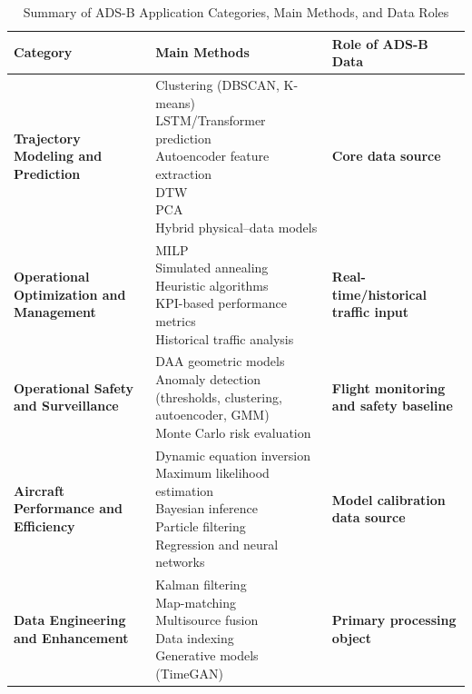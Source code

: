  
\begin{table}[htbp]
\centering
\caption{Summary of ADS-B Application Categories, Main Methods, and Data Roles}
\begin{tabular}{p{3cm} p{6cm} p{3cm}}
\hline
\textbf{Category} & \textbf{Main Methods} & \textbf{Role of ADS-B Data} \\
\hline
\textbf{Trajectory Modeling and Prediction} &
\makecell[l]{Clustering (DBSCAN, K-means)\\
LSTM/Transformer prediction\\
Autoencoder feature extraction\\
DTW\\
PCA\\
Hybrid physical–data models} &
\textbf{Core data source} \\
\hline

\textbf{Operational Optimization and Management} &
\makecell[l]{
MILP\\
Simulated annealing\\
Heuristic algorithms\\
KPI-based performance metrics\\
Historical traffic analysis
} &
\textbf{Real-time/historical traffic input} \\
\hline

\textbf{Operational Safety and Surveillance} &
\makecell[l]{
DAA geometric models\\
Anomaly detection (thresholds, clustering, autoencoder, GMM)\\
Monte Carlo risk evaluation
} &
\textbf{Flight monitoring and safety baseline} \\
\hline

\textbf{Aircraft Performance and Efficiency} &
\makecell[l]{
Dynamic equation inversion\\
Maximum likelihood estimation\\
Bayesian inference\\
Particle filtering\\
Regression and neural networks
} &
\textbf{Model calibration data source} \\
\hline

\textbf{Data Engineering and Enhancement} &
\makecell[l]{
Kalman filtering\\
Map-matching\\
Multisource fusion\\
Data indexing\\
Generative models (TimeGAN)
} &
\textbf{Primary processing object} \\
\hline


\end{tabular}
\end{table}
